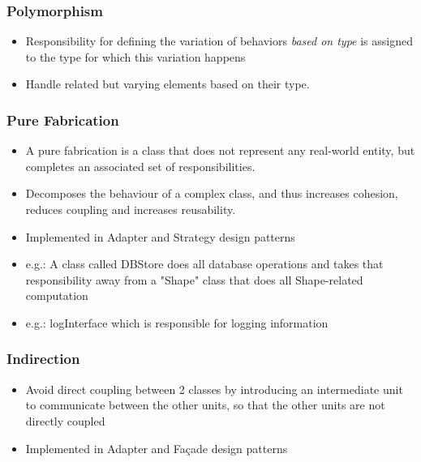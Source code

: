 \documentclass{article}
\begin{document}
\subsubsection{Polymorphism}
\begin{itemize}
    \item Responsibility for defining the variation of behaviors \textit{based on type} is assigned to the type for which this variation happens
    
    \item Handle related but varying elements based on their type. 
\end{itemize}

\subsubsection{Pure Fabrication}
\begin{itemize}
    \item A pure fabrication is a class that does not represent any real-world entity, but completes an associated set of responsibilities. 
    
    \item Decomposes the behaviour of a complex class, and thus increases cohesion, reduces coupling and increases reusability.
    
    \item Implemented in Adapter and Strategy design patterns
    
    \item e.g.: A class called DBStore does all database operations and takes that responsibility away from a "Shape" class that does all Shape-related computation
    
    \item e.g.: logInterface which is responsible for logging information 
\end{itemize}
\subsubsection{Indirection}
\begin{itemize}
    \item Avoid direct coupling between 2 classes by introducing an intermediate unit to communicate between the other units, so that the other units are not directly coupled
    
    \item Implemented in Adapter and Fa\c{c}ade design patterns 
\end{itemize}
\end{document}
